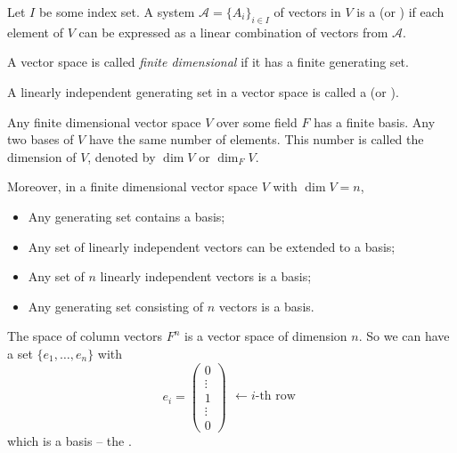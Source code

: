 \begin{definition}
	Let $I$ be some index set. A system $\mathcal{A} = \{A_i\}_{i \in I}$ of vectors in $V$ is a  (or ) if each element of $V$ can be expressed as a linear combination of vectors from $\mathcal{A}$.
	
	A vector space is called \emph{finite dimensional} if it has a finite generating set.
\end{definition}

\begin{definition}
	A linearly independent generating set in a vector space is called a  (or ).
\end{definition}

\begin{theorem}
	Any finite dimensional vector space $V$ over some field $F$ has a finite basis. Any two bases of $V$ have the same number of elements. This number is called the dimension of $V$, denoted by $\dim{V}$ or $\dim_F{V}$.
\end{theorem}

Moreover, in a finite dimensional vector space $V$ with $\dim{V} = n$,
\begin{itemize}
	\item Any generating set contains a basis;
	\item Any set of linearly independent vectors can be extended to a basis;
	\item Any set of $n$ linearly independent vectors is a basis;
	\item Any generating set consisting of $n$ vectors is a basis.
\end{itemize}

\begin{example}
	The space of column vectors $F^n$ is a vector space of dimension $n$. So we can have a set $\{e_1, \ldots, e_n\}$ with
	\[
		e_i =
		\begin{pmatrix}
			0 \\
			\vdots \\
			1 \\
			\vdots \\
			0
		\end{pmatrix}
		\begin{matrix}
			 \\
			 \\
			\leftarrow i\text{-th row} \\
			 \\
			 \\
		\end{matrix}
	\]
	which is a basis -- the .
\end{example}
